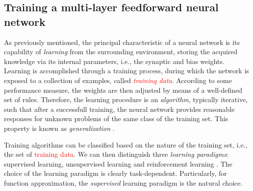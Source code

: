 \documentclass[longtitle]{elsarticle}
\numberwithin{equation}{section}
\theoremstyle{theorem}
\theoremstyle{definition}
\theoremstyle{remark}
\theoremstyle{proposition}
\numberwithin{figure}{section}
\begin{document}
		
	
	\subsection{Training a multi-layer feedforward neural network}
	\label{section:Training a multi-layer feedforward neural network}
	
		As previously mentioned, the principal characteristic of a neural network is its capability of \emph{learning} from the surrounding environment, storing the acquired knowledge via its internal parameters, i.e., the synaptic and bias weights. Learning is accomplished through a training process, during which the network is exposed to a collection of examples, called \textcolor{red}{\emph{training data}}. According to some performance measure, the weights are then adjusted by means of a well-defined set of rules. Therefore, the learning procedure is an \emph{algorithm}, typically iterative, such that after a successfull training, the neural network provides reasonable responses for unknown problems of the same class of the training set. This property is known as \emph{generalization} \cite{Kri07}. 
		
		Training algorithms can be classified based on the nature of the training set, i.e., the set of \textcolor{red}{training data}. We can then distinguish three \emph{learning paradigms}: supervised learning, unsupervised learning and reinforcement learning \cite{Hag96}. The choice of the learning paradigm is clearly task-dependent. Particularly, for function approximation, the \emph{supervised} learning paradigm is the natural choice. 
		
\end{document}
